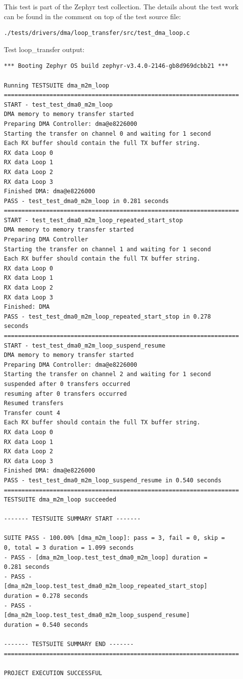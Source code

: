 \documentclass[11pt,a4paper,oneside]{article}
\begin{document}
This test is part of the Zephyr test collection. The details about the
test work can be found in the comment on top of the test source file:
\begin{lstlisting}
./tests/drivers/dma/loop_transfer/src/test_dma_loop.c
\end{lstlisting}

Test loop\_transfer output:

\begin{lstlisting}
*** Booting Zephyr OS build zephyr-v3.4.0-2146-gb8d969dcbb21 ***

Running TESTSUITE dma_m2m_loop
===================================================================
START - test_test_dma0_m2m_loop
DMA memory to memory transfer started
Preparing DMA Controller: dma@e8226000
Starting the transfer on channel 0 and waiting for 1 second
Each RX buffer should contain the full TX buffer string.
RX data Loop 0
RX data Loop 1
RX data Loop 2
RX data Loop 3
Finished DMA: dma@e8226000
PASS - test_test_dma0_m2m_loop in 0.281 seconds
===================================================================
START - test_test_dma0_m2m_loop_repeated_start_stop
DMA memory to memory transfer started
Preparing DMA Controller
Starting the transfer on channel 1 and waiting for 1 second
Each RX buffer should contain the full TX buffer string.
RX data Loop 0
RX data Loop 1
RX data Loop 2
RX data Loop 3
Finished: DMA
PASS - test_test_dma0_m2m_loop_repeated_start_stop in 0.278
seconds
===================================================================
START - test_test_dma0_m2m_loop_suspend_resume
DMA memory to memory transfer started
Preparing DMA Controller: dma@e8226000
Starting the transfer on channel 2 and waiting for 1 second
suspended after 0 transfers occurred
resuming after 0 transfers occurred
Resumed transfers
Transfer count 4
Each RX buffer should contain the full TX buffer string.
RX data Loop 0
RX data Loop 1
RX data Loop 2
RX data Loop 3
Finished DMA: dma@e8226000
PASS - test_test_dma0_m2m_loop_suspend_resume in 0.540 seconds
===================================================================
TESTSUITE dma_m2m_loop succeeded

------- TESTSUITE SUMMARY START -------

SUITE PASS - 100.00% [dma_m2m_loop]: pass = 3, fail = 0, skip =
0, total = 3 duration = 1.099 seconds
- PASS - [dma_m2m_loop.test_test_dma0_m2m_loop] duration =
0.281 seconds
- PASS -
[dma_m2m_loop.test_test_dma0_m2m_loop_repeated_start_stop]
duration = 0.278 seconds
- PASS -
[dma_m2m_loop.test_test_dma0_m2m_loop_suspend_resume]
duration = 0.540 seconds

------- TESTSUITE SUMMARY END -------
===================================================================

PROJECT EXECUTION SUCCESSFUL
\end{lstlisting}
\end{document}
